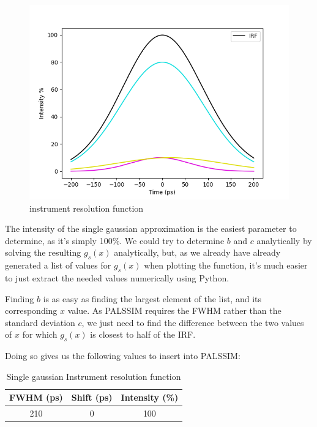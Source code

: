 \begin{figure}
    \centering
    \includegraphics[width=0.8\linewidth]{Batch 3/regular IRF/irf.png}
    \caption{instrument resolution function}
    \label{fig:irf}
\end{figure}

The intensity of the single gaussian approximation is the easiest parameter to determine, as it's simply 100\%. We could try to determine $b$ and $c$ analytically by solving the resulting $g_s(x)$ analytically, but, as we already have already generated a list of values for $g_s(x)$ when plotting the function, it's much easier to just extract the needed values numerically using Python.

Finding $b$ is as easy as finding the largest element of the list, and its corresponding $x$ value. As PALSSIM requires the FWHM rather than the standard deviation $c$, we just need to find the difference between the two values of $x$ for which $g_s(x)$ is closest to half of the IRF.

Doing so gives us the following values to insert into PALSSIM:

\begin{table}[h]
    \centering
    \begin{tabular}{|c|c|c|}
        \hline
        FWHM (ps) &  Shift (ps) & Intensity (\%) \\
        \hline
        210 & 0 & 100\\ 
        \hline
    \end{tabular}
    \caption{Single gaussian Instrument resolution function}
    \label{tab:irf-single}
\end{table}

